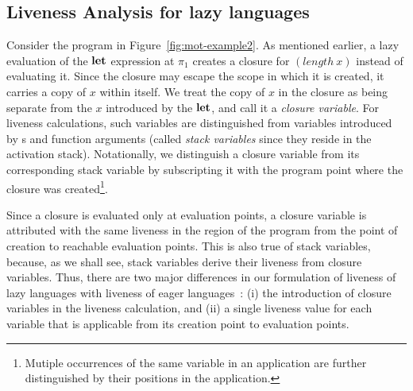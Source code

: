 \documentclass[preprint,9pt]{sigplanconf}
\newcommand{\comment}[1]{{\color{Myblue}{#1}}}
\begin{document}


\subsection{Liveness Analysis for lazy languages}
\label{sec:liveness-analysis}
  
Consider  the program in  Figure~\ref{fig:mot-example2}.  As
  mentioned earlier,  a lazy  evaluation of  the $\mbox{$\mathbf{ let}$}$  expression at
  $\pi_1$ creates a closure for $(length~x)$ instead of evaluating it.
  Since the  closure may escape the  scope in which it  is created, it
  carries a copy  of $x$ within itself.   We treat the copy  of $x$ in
  the closure as being separate from the $x$ introduced by the $\mbox{$\mathbf{ let}$}$,
  and call  it a \emph{closure variable}.   For liveness calculations,
  such variables are distinguished from variables introduced by \LET s
  and  function arguments  (called \emph{stack  variables} since  they
  reside in the activation stack). Notationally, we distinguish
  a closure variable from its corresponding stack variable by
  subscripting it with the program point where the closure was created\footnote{Mutiple occurrences of the same variable in an
    application are further distinguished by their positions in the
    application.}. 


  Since a  closure is evaluated  only at evaluation points,  a closure
  variable is attributed  with the same liveness in the  region of the
  program from the  point of creation to  reachable evaluation points.
  This is  also true  of stack  variables, because,  as we  shall see,
  stack variables derive their  liveness from closure variables. Thus,
  there are  two major differences  in our formulation of  liveness of
  lazy   languages  with   liveness  of   eager 
  languages~\cite{asati14lgc}:    (i)  the
  introduction of  closure variables in the  liveness calculation, and
  (ii) a  single liveness value  for each variable that  is applicable
  from its creation point to evaluation points.
\end{document}
